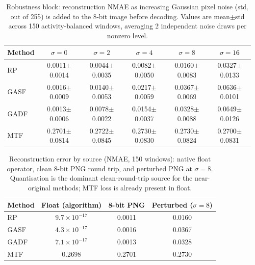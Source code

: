\begin{table}[!htbp]
\centering
\caption{Robustness block: reconstruction NMAE as increasing Gaussian pixel noise (std, out of 255) is added to the 8-bit image before decoding. Values are mean$\pm$std across 150 activity-balanced windows, averaging 2 independent noise draws per nonzero level.}
\label{tab:robustness}
\begin{tabular}{lccccc}
\toprule
Method & $\sigma=0$ & $\sigma=2$ & $\sigma=4$ & $\sigma=8$ & $\sigma=16$ \\
\midrule
RP & 0.0011$\pm$0.0014 & 0.0044$\pm$0.0035 & 0.0082$\pm$0.0050 & 0.0160$\pm$0.0083 & 0.0327$\pm$0.0133 \\
GASF & 0.0016$\pm$0.0009 & 0.0140$\pm$0.0053 & 0.0217$\pm$0.0059 & 0.0367$\pm$0.0069 & 0.0636$\pm$0.0101 \\
GADF & 0.0013$\pm$0.0006 & 0.0078$\pm$0.0022 & 0.0154$\pm$0.0037 & 0.0328$\pm$0.0088 & 0.0649$\pm$0.0126 \\
MTF & 0.2701$\pm$0.0814 & 0.2722$\pm$0.0845 & 0.2730$\pm$0.0830 & 0.2730$\pm$0.0824 & 0.2700$\pm$0.0831 \\
\bottomrule
\end{tabular}
\end{table}

\begin{table}[!htbp]
\centering
\caption{Reconstruction error by source (NMAE, 150 windows): native float operator, clean 8-bit PNG round trip, and perturbed PNG at $\sigma=8$. Quantisation is the dominant clean-round-trip source for the near-original methods; MTF loss is already present in float.}
\label{tab:error_sources}
\begin{tabular}{lccc}
\toprule
Method & Float (algorithm) & 8-bit PNG & Perturbed ($\sigma=8$) \\
\midrule
RP & $9.7\times10^{-17}$ & 0.0011 & 0.0160 \\
GASF & $4.3\times10^{-17}$ & 0.0016 & 0.0367 \\
GADF & $7.1\times10^{-17}$ & 0.0013 & 0.0328 \\
MTF & 0.2698 & 0.2701 & 0.2730 \\
\bottomrule
\end{tabular}
\end{table}
